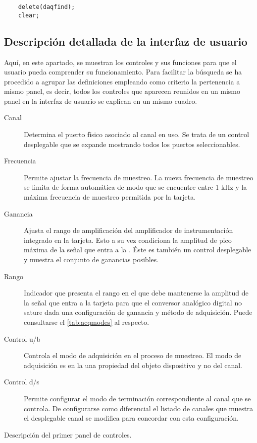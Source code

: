\begin{lstlisting}
	delete(daqfind);
	clear;
\end{lstlisting}


\subsection{Descripción detallada de la interfaz de usuario}

Aquí, en este apartado, se muestran los controles y sus funciones para que el usuario pueda comprender su funcionamiento. Para facilitar la búsqueda se ha procedido a agrupar las definiciones empleando como criterio la pertenencia a mismo panel, es decir, todos los controles que aparecen reunidos en un mismo panel en la interfaz de usuario se explican en un mismo cuadro.

\begin{table}
	\centering
	\begin{minipage}{.85\textwidth}
		\begin{description}
			\item[Canal] Determina el puerto físico asociado al canal en uso. Se trata de un control desplegable que se expande mostrando todos los puertos seleccionables.
			\item[Frecuencia] Permite ajustar la frecuencia de muestreo. La nueva frecuencia de muestreo se limita de forma automática de modo que se encuentre entre 1 kHz y la máxima frecuencia de muestreo permitida por la tarjeta.
			\item[Ganancia] Ajusta el rango de amplificación del amplificador de instrumentación integrado en la tarjeta. Esto a su vez condiciona la amplitud de pico máxima de la señal que entra a la \kpci{}. Éste es también un control desplegable y muestra el conjunto de ganancias posibles.
			\item[Rango] Indicador que presenta el rango en el que debe mantenerse la amplitud de la señal que entra a la tarjeta para que el conversor analógico digital no sature dada una configuración de ganancia y método de adquisición. Puede consultarse el \vref{tab:acqmodes} al respecto.
			\item[Control u/b] Controla el modo de adquisición en el proceso de muestreo. El modo de adquisición es en la \datx{} una propiedad del objeto dispositivo y no del canal.
			\item[Control d/s] Permite configurar el modo de terminación correspondiente al canal que se controla. De configurarse como diferencial el listado de canales que muestra el desplegable \textsf{canal} se modifica para concordar con esta configuración.
		\end{description}
	\end{minipage}
	\caption[Descripción del primer panel de controles]{Descripción del primer panel de controles.}
	\label{tab:first-panel}
\end{table}

